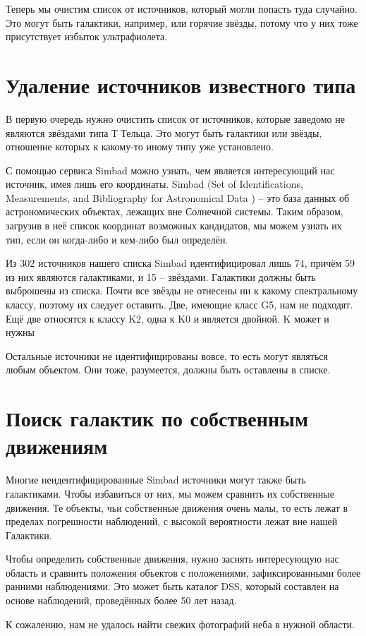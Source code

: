 Теперь мы очистим список от источников, который могли попасть туда случайно. Это могут быть галактики, например, или горячие звёзды, потому что у них тоже присутствует избыток ультрафиолета.

\section{Удаление источников известного типа}
В первую очередь нужно очистить список от источников, которые заведомо не являются звёздами типа Т Тельца. Это могут быть галактики или звёзды, отношение которых к какому-то иному типу уже установлено.

С помощью сервиса Simbad можно узнать, чем является интересующий нас источник, имея лишь его координаты. Simbad (Set of Identifications, Measurements, and Bibliography for Astronomical Data ) -- это база данных об астрономических объектах, лежащих вне Солнечной системы. Таким образом, загрузив в неё список координат возможных кандидатов, мы можем узнать их тип, если он когда-либо и кем-либо был определён.

Из 302 источников нашего списка Simbad идентифицировал лишь 74, причём 59 из них являются галактиками, и 15 -- звёздами. Галактики должны быть выброшены из списка. Почти все звёзды не отнесены ни к какому спектральному классу, поэтому их следует оставить. Две, имеющие класс G5, нам не подходят. Ещё две относятся к классу K2, одна к K0 и является двойной. K может и нужны

Остальные источники не идентифицированы вовсе, то есть могут являться любым объектом. Они тоже, разумеется, должны быть оставлены в списке.

\section{Поиск галактик по собственным движениям}
Многие неидентифицированные Simbad источники могут также быть галактиками. Чтобы избавиться от них, мы можем сравнить их собственные движения. Те объекты, чьи собственные движения очень малы, то есть лежат в пределах погрешности наблюдений, с высокой вероятности лежат вне нашей Галактики.

Чтобы определить собственные движения, нужно заснять интересующую нас область и сравнить положения объектов с положениями, зафиксированными более ранними наблюдениями. Это может быть каталог DSS, который составлен на основе наблюдений, проведённых более 50 лет назад.

К сожалению, нам не удалось найти свежих фотографий неба в нужной области. 

